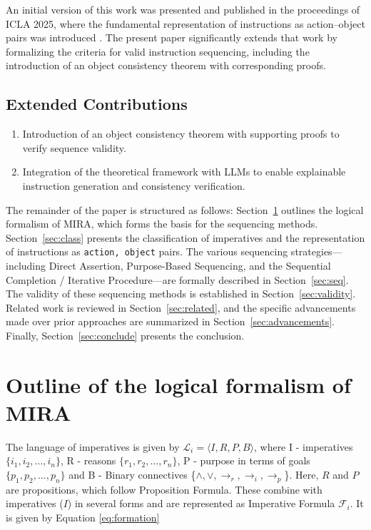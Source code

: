 \documentclass[a4paper,11pt]{lmcs}
\begin{document}
An initial version of this work was presented and published in the proceedings of ICLA 2025, where the fundamental representation of instructions as action–object pairs was introduced \cite{llm_mira}. The present paper significantly extends that work by formalizing the criteria for valid instruction sequencing, including the introduction of an object consistency theorem with corresponding proofs.

\subsection*{Extended Contributions}
\begin{enumerate}
\item Introduction of an object consistency theorem with supporting proofs to verify sequence validity.
\item Integration of the theoretical framework with LLMs to enable explainable instruction generation and consistency verification.
\end{enumerate}

The remainder of the paper is structured as follows: Section~\ref{sec:mira} outlines the logical formalism of MIRA, which forms the basis for the sequencing methods. Section~\ref{sec:class} presents the classification of imperatives and the representation of instructions as \texttt{action, object} pairs. The various sequencing strategies—including Direct Assertion, Purpose-Based Sequencing, and the Sequential Completion / Iterative Procedure—are formally described in Section~\ref{sec:seq}. The validity of these sequencing methods is established in Section~\ref{sec:validity}. Related work is reviewed in Section~\ref{sec:related}, and the specific advancements made over prior approaches are summarized in Section~\ref{sec:advancements}. Finally, Section~\ref{sec:conclude} presents the conclusion.

\section{Outline of the logical formalism of MIRA}
\label{sec:mira}
The language of imperatives is given by $\mathcal{L}_i = \langle I,R,P,B\rangle$, where
I - imperatives \( \{ i_1, i_2, \ldots, i_n \} \), R - reasons \( \{ r_1, r_2, \ldots, r_n \} \), P - purpose in terms of goals \( \{ p_1, p_2, \ldots, p_n \} \) and B - Binary connectives \{$\wedge,\vee, \rightarrow_r, \rightarrow_i, \rightarrow_p$\}. Here, $R$ and $P$ are propositions, which follow Proposition Formula. These combine with imperatives ($I$) in several forms and are represented as Imperative Formula $\mathcal{F}_i$. It is given by Equation \ref{eq:formation}
\end{document}
